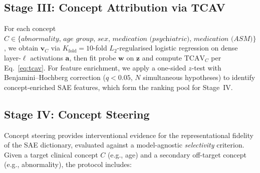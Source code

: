 \documentclass{article}
\begin{document}
\subsection{Stage III: Concept Attribution via TCAV}
\label{sec:stage-iii}

For each concept $C \in \{\textit{abnormality, age group, sex, medication
(psychiatric), medication (ASM)}\}$, we obtain $\mathbf{v}_C$ via
$K_{\mathrm{fold}}=10$-fold $L_2$-regularised logistic regression on
dense layer-$\ell$ activations $\mathbf{a}$, then fit probe $\mathbf{w}$
on $\mathbf{z}$ and compute $\mathrm{TCAV}_C$ per Eq.~\ref{eq:tcav}.
For feature enrichment, we apply a one-sided $z$-test with
Benjamini--Hochberg correction ($q < 0.05$, $N$ simultaneous hypotheses)
to identify concept-enriched SAE features, which form the ranking pool
for Stage~IV.                                                    
\subsection{Stage IV: Concept Steering}\label{sec:steering}

Concept steering provides interventional evidence for the representational fidelity of the SAE dictionary, evaluated against a model-agnostic \emph{selectivity} criterion. Given a target clinical concept $C$ (e.g., age) and a secondary off-target concept (e.g., abnormality), the protocol includes:
\end{document}
